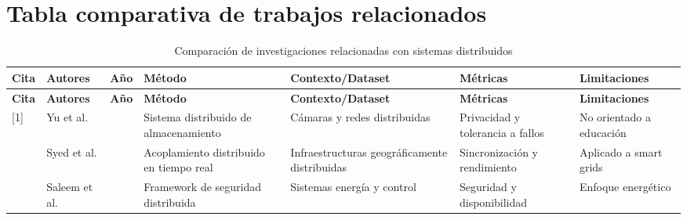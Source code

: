 \documentclass[12pt,a4paper]{article}
\begin{document}
\section{Tabla comparativa de trabajos relacionados}

\renewcommand{\arraystretch}{1.25}

\scriptsize


\begin{longtable}{
>{\centering\arraybackslash}p{0.7cm}
>{\raggedright\arraybackslash}p{1.6cm}
>{\centering\arraybackslash}p{0.8cm}
>{\raggedright\arraybackslash}p{2.6cm}
>{\raggedright\arraybackslash}p{2.4cm}
>{\raggedright\arraybackslash}p{2.2cm}
>{\raggedright\arraybackslash}p{2.2cm}
}

\caption{Comparación de investigaciones relacionadas con sistemas distribuidos}
\\

\toprule

\rowcolor{uteqBlue}

\color{white}\textbf{Cita}
&
\color{white}\textbf{Autores}
&
\color{white}\textbf{Año}
&
\color{white}\textbf{Método}
&
\color{white}\textbf{Contexto/Dataset}
&
\color{white}\textbf{Métricas}
&
\color{white}\textbf{Limitaciones}

\\

\midrule
\endfirsthead


\toprule

\rowcolor{uteqBlue}

\color{white}\textbf{Cita}
&
\color{white}\textbf{Autores}
&
\color{white}\textbf{Año}
&
\color{white}\textbf{Método}
&
\color{white}\textbf{Contexto/Dataset}
&
\color{white}\textbf{Métricas}
&
\color{white}\textbf{Limitaciones}

\\

\midrule
\endhead


[1]&Yu et al.&2020&
Sistema distribuido de almacenamiento&
Cámaras y redes distribuidas&
Privacidad y tolerancia a fallos&
No orientado a educación\\

[2]&Syed et al.&2021&
Acoplamiento distribuido en tiempo real&
Infraestructuras geográficamente distribuidas&
Sincronización y rendimiento&
Aplicado a smart grids\\

[3]&Saleem et al.&2020&
Framework de seguridad distribuida&
Sistemas energía y control&
Seguridad y disponibilidad&
Enfoque energético\\


\end{longtable}
\end{document}
